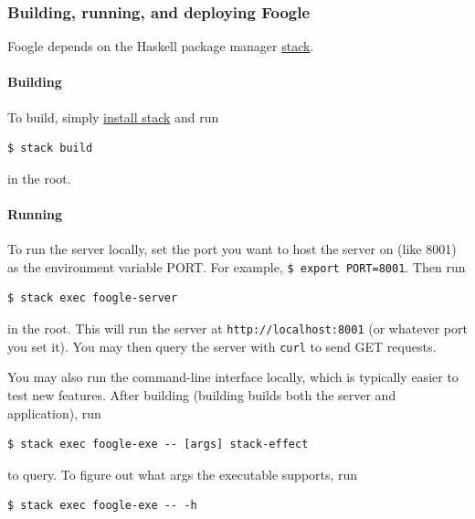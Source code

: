 \documentclass[
]{article}
\begin{document}
\hypertarget{building-running-and-deploying-foogle}{%
\subsubsection{Building, running, and deploying
Foogle}\label{building-running-and-deploying-foogle}}

Foogle depends on the Haskell package manager
\href{https://docs.haskellstack.org/en/stable/README/}{stack}.

\hypertarget{building}{%
\paragraph{Building}\label{building}}

To build, simply
\href{https://docs.haskellstack.org/en/stable/install_and_upgrade/}{install
stack} and run

\begin{verbatim}
$ stack build
\end{verbatim}

in the root.

\hypertarget{running}{%
\paragraph{Running}\label{running}}

To run the server locally, set the port you want to host the server on
(like 8001) as the environment variable PORT. For example,
\texttt{\$\ export\ PORT=8001}. Then run

\begin{verbatim}
$ stack exec foogle-server
\end{verbatim}

in the root. This will run the server at \texttt{http://localhost:8001}
(or whatever port you set it). You may then query the server with
\texttt{curl} to send GET requests.

You may also run the command-line interface locally, which is typically
easier to test new features. After building (building builds both the
server and application), run

\begin{verbatim}
$ stack exec foogle-exe -- [args] stack-effect
\end{verbatim}

to query. To figure out what args the executable supports, run

\begin{verbatim}
$ stack exec foogle-exe -- -h
\end{verbatim}
\end{document}
